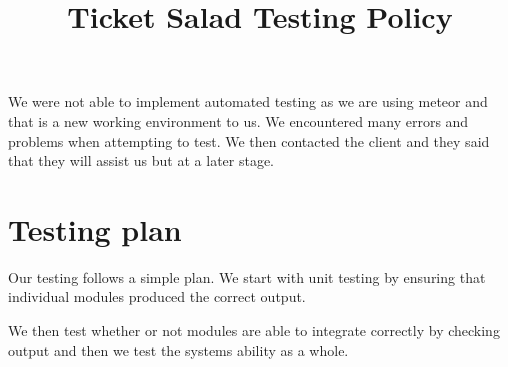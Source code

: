 \documentclass[11pt]{article}
\begin{document}
	\title{Ticket Salad Testing Policy}
	\date{}
	\maketitle
	We were not able to implement automated testing as we are using meteor and that is a new working environment to us. We encountered many errors and problems when attempting to test. We then contacted the client and they said that they will assist us but at a later stage.
	
	\section{Testing plan}
	Our testing follows a simple plan. We start with unit testing by ensuring that individual modules produced the correct output. 
	
	We then test whether or not modules are able to integrate correctly by checking output and then we test the systems ability as a whole.
\end{document}
